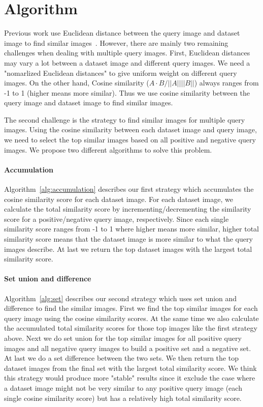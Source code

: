 \section{Algorithm}
\label{sec:algo}

Previous work use Euclidean distance between the query image and dataset image
to find similar images~\cite{lin2015deep}. However, there are mainly two
remaining challenges when dealing with multiple query images. First, Euclidean
distances may vary a lot between a dataset image and different query images. We
need a "nomarlized Euclidean distances" to give uniform weight on different query
images.  On the other hand, Cosine similarity ($A \cdot B/||A||||B||$) always
ranges from -1 to 1 (higher means more similar). Thus we use cosine similarity
between the query image and dataset image to find similar images.

The second challenge is the strategy to find similar images for multiple query images.
Using the cosine similarity between each dataset image and query image, we need
to select the top similar images based on all positive and negative query images.
We propose two different algorithms to solve this problem.

\paragraph{Accumulation}
Algorithm~\ref{alg:accumulation} describes our first strategy which accumulates the
cosine similarity score for each dataset image. For each dataset image, we calculate
the total similarity score by incrementing/decrementing the similarity score for a
positive/negative query image, respectively. Since each single similarity score ranges
from -1 to 1 where higher means more similar, higher total similarity score means that
the dataset image is more similar to what the query images describe. At last we return
the top dataset images with the largest total similarity score.

\paragraph{Set union and difference}
Algorithm~\ref{alg:set} describes our second strategy which uses set union and difference
to find the similar images. First we find the top similar images for each query image
using the cosine similarity scores. At the same time we also calculate the accumulated
total similarity scores for those top images like the first strategy above.
Next we do set union for the top similar images for
all positive query images and all negative query images to build a positive set and a negative
set. At last we do a set difference between the two sets. We then return the top
dataset images from the final set with the largest total similarity score. We think this
strategy would produce more "stable" results since it exclude the case where a dataset image
might not be very similar to any positive query image (each single cosine similarity score) but
has a relatively high total similarity score.




